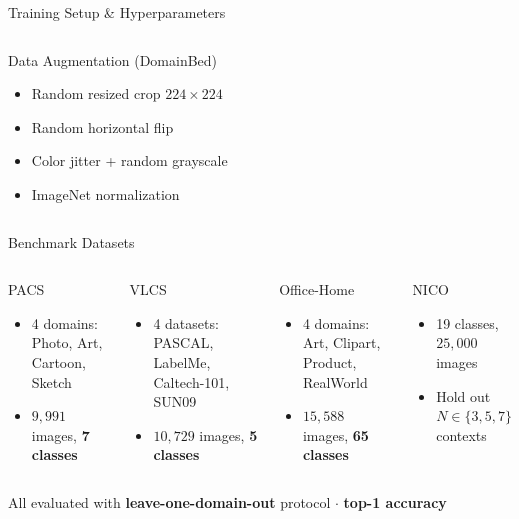 \documentclass[aspectratio=169,10pt]{beamer}
\begin{document}
\begin{frame}{Training Setup \& Hyperparameters}
\begin{columns}[T]
      \vspace{0.4em}
      \begin{block}{Data Augmentation (DomainBed)}
        \begin{itemize}
          \item Random resized crop $224{\times}224$
          \item Random horizontal flip
          \item Color jitter + random grayscale
          \item ImageNet normalization
        \end{itemize}
      \end{block}
  \end{columns}
\end{frame}

\begin{frame}{Benchmark Datasets}
  \begin{columns}[T]
      \begin{block}{PACS}
        \begin{itemize}
          \item 4 domains: Photo, Art, Cartoon, Sketch
          \item $9{,}991$ images, \textbf{7 classes}
        \end{itemize}
      \end{block}
      \vspace{0.3em}
      \begin{block}{VLCS}
        \begin{itemize}
          \item 4 datasets: PASCAL, LabelMe, Caltech-101, SUN09
          \item $10{,}729$ images, \textbf{5 classes}
        \end{itemize}
      \end{block}

      \begin{block}{Office-Home}
        \begin{itemize}
          \item 4 domains: Art, Clipart, Product, RealWorld
          \item $15{,}588$ images, \textbf{65 classes}
        \end{itemize}
      \end{block}
      \vspace{0.3em}
      \begin{block}{NICO}
        \begin{itemize}
          \item 19 classes, $25{,}000$ images
          \item Hold out $N \in \{3,5,7\}$ contexts
        \end{itemize}
      \end{block}
  \end{columns}

  \vspace{0.5em}
  \centering
  \small All evaluated with \textbf{leave-one-domain-out} protocol $\cdot$ \textbf{top-1 accuracy}
\end{frame}
\end{document}
